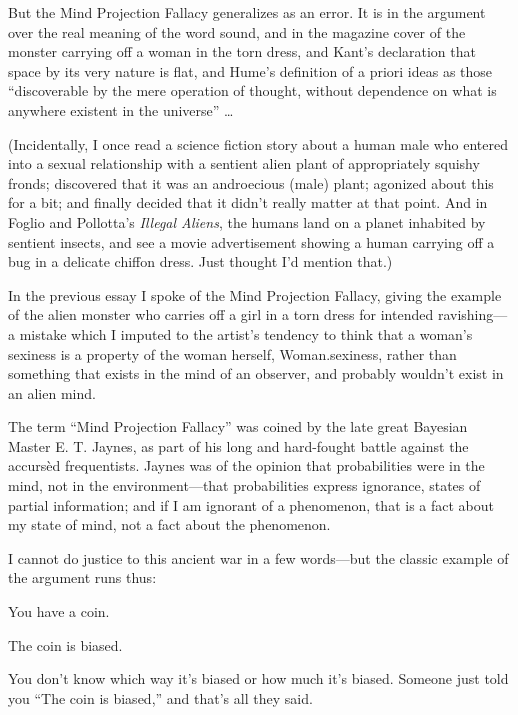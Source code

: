 {
 But the Mind Projection Fallacy generalizes as an error. It is in
the argument over the real meaning of the word sound, and in the
magazine cover of the monster carrying off a woman in the torn dress,
and Kant's declaration that space by its very nature is
flat, and Hume's definition of a priori ideas as those
``discoverable by the mere operation of thought,
without dependence on what is anywhere existent in the
universe'' \ldots}

{
 (Incidentally, I once read a science fiction story about a human
male who entered into a sexual relationship with a sentient alien plant
of appropriately squishy fronds; discovered that it was an androecious
(male) plant; agonized about this for a bit; and finally decided that
it didn't really matter at that point. And in Foglio
and Pollotta's \textit{Illegal Aliens}, the humans land
on a planet inhabited by sentient insects, and see a movie
advertisement showing a human carrying off a bug in a delicate chiffon
dress. Just thought I'd mention that.)}

\myendsectiontext


{
 In the previous essay I spoke of the Mind Projection Fallacy,
giving the example of the alien monster who carries off a girl in a
torn dress for intended ravishing---a mistake which I imputed to the
artist's tendency to think that a
woman's sexiness is a property of the woman herself,
Woman.sexiness, rather than something that exists in the mind of an
observer, and probably wouldn't exist in an alien
mind.}

{
 The term ``Mind Projection
Fallacy'' was coined by the late great Bayesian
Master E. T. Jaynes, as part of his long and hard-fought battle against
the accursèd frequentists. Jaynes was of the opinion that probabilities
were in the mind, not in the environment---that probabilities express
ignorance, states of partial information; and if I am ignorant of a
phenomenon, that is a fact about my state of mind, not a fact about the
phenomenon.}

{
 I cannot do justice to this ancient war in a few words---but the
classic example of the argument runs thus:}

{
 You have a coin.}

{
 The coin is biased.}

{
 You don't know which way it's
biased or how much it's biased. Someone just told you
``The coin is biased,'' and
that's all they said.}

